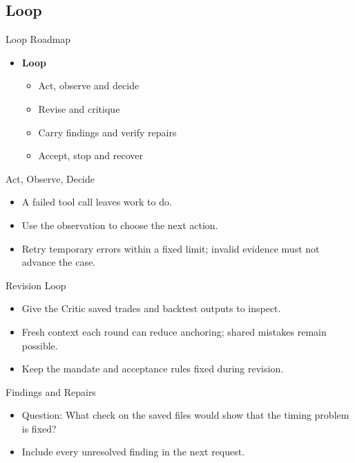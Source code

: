 \subsection{Loop}
\begin{frame}{Loop Roadmap}
\begin{itemize}
\item \textbf{Loop}
\begin{itemize}
\item Act, observe and decide
\item Revise and critique
\item Carry findings and verify repairs
\item Accept, stop and recover
\end{itemize}
\end{itemize}
\end{frame}
\begin{frame}{Act, Observe, Decide}
\begin{center}\resizebox{.91\textwidth}{!}{}\end{center}
\begin{itemize}
\item A failed tool call leaves work to do.
\item Use the observation to choose the next action.
\item Retry temporary errors within a fixed limit; invalid evidence must not advance the case.
\end{itemize}
\end{frame}
\begin{frame}{Revision Loop}
\setlength{\topsep}{0pt}
\begin{center}\resizebox{.96\textwidth}{!}{}\end{center}
\begin{itemize}
\item Give the Critic saved trades and backtest outputs to inspect.
\item Fresh context each round can reduce anchoring; shared mistakes remain possible.
\item Keep the mandate and acceptance rules fixed during revision.
\end{itemize}
\end{frame}
\begin{frame}{Findings and Repairs\handsup}
\setlength{\topsep}{0pt}
\begin{center}\resizebox{.94\textwidth}{!}{}\end{center}
\begin{itemize}
\item Question: What check on the saved files would show that the timing problem is fixed?
\item Include every unresolved finding in the next request.
\end{itemize}
\end{frame}
